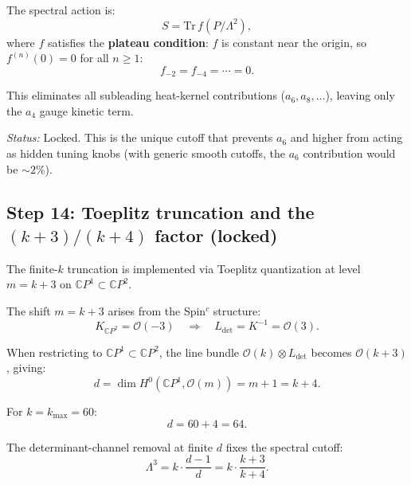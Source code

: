 \documentclass[12pt,a4paper]{article}
\begin{document}
The spectral action is:
\begin{equation}\tag{E13a}
S = \mathrm{Tr}\,f(P/\Lambda^2),
\end{equation}
where $f$ satisfies the \textbf{plateau condition}: $f$ is constant
near the origin, so $f^{(n)}(0) = 0$ for all $n \geq 1$:
\begin{equation}\tag{E13b}
f_{-2} = f_{-4} = \cdots = 0.
\end{equation}

This eliminates all subleading heat-kernel contributions ($a_6, a_8, \ldots$),
leaving only the $a_4$ gauge kinetic term.

\textit{Status:} Locked.  This is the unique cutoff that prevents
$a_6$ and higher from acting as hidden tuning knobs (with generic smooth
cutoffs, the $a_6$ contribution would be $\sim 2\%$).

\subsection{Step 14: Toeplitz truncation and the $(k+3)/(k+4)$ factor (locked)}

The finite-$k$ truncation is implemented via Toeplitz quantization at
level $m = k + 3$ on $\mathbb{C}P^1 \subset \mathbb{C}P^2$.

The shift $m = k + 3$ arises from the Spin$^c$ structure:
\begin{equation}\tag{E14a}
K_{\mathbb{C}P^2} = \mathcal{O}(-3) \quad\Rightarrow\quad
L_{\det} = K^{-1} = \mathcal{O}(3).
\end{equation}

When restricting to $\mathbb{C}P^1 \subset \mathbb{C}P^2$, the line
bundle $\mathcal{O}(k) \otimes L_{\det}$ becomes $\mathcal{O}(k+3)$,
giving:
\begin{equation}\tag{E14b}
d = \dim H^0(\mathbb{C}P^1, \mathcal{O}(m)) = m + 1 = k + 4.
\end{equation}

For $k = k_{\max} = 60$:
\begin{equation}\tag{E14c}
d = 60 + 4 = 64.
\end{equation}

The determinant-channel removal at finite $d$ fixes the spectral cutoff:
\begin{equation}\tag{E14d}
\Lambda^3 = k \cdot \frac{d-1}{d} = k \cdot \frac{k+3}{k+4}.
\end{equation}
\end{document}
